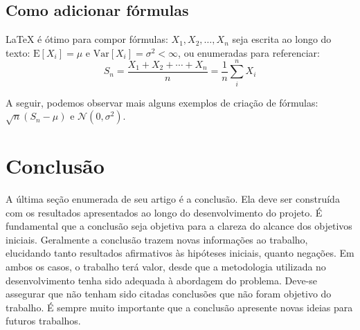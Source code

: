 \documentclass[a4paper,12pt]{article}
\begin{document}
\subsection{Como adicionar fórmulas}

\LaTeX{} é ótimo para compor fórmulas: $X_1, X_2, \ldots, X_n$ seja escrita ao longo do texto: $\text{E}[X_i] = \mu$ e $\text{Var}[X_i] = \sigma^2 < \infty$, ou enumeradas para referenciar:
\begin{equation}
  S_n = \frac{X_1 + X_2 + \cdots + X_n}{n}
      = \frac{1}{n}\sum_{i}^{n} X_i
\end{equation}

A seguir, podemos observar mais alguns exemplos de criação de fórmulas: $\sqrt{n}(S_n - \mu)$ e $\mathcal{N}(0, \sigma^2)$.

\section{Conclusão}
A última seção enumerada de seu artigo é a conclusão. Ela deve ser construída  com os resultados apresentados ao longo do desenvolvimento do projeto. É fundamental que a conclusão seja objetiva para a clareza do alcance dos objetivos iniciais. Geralmente a conclusão trazem novas informações ao trabalho, elucidando tanto resultados afirmativos às hipóteses iniciais, quanto negações. Em ambos os casos, o trabalho terá valor, desde que a metodologia utilizada no desenvolvimento tenha sido adequada à abordagem do problema.
Deve-se assegurar que não tenham sido citadas conclusões que não foram objetivo do trabalho. É sempre muito importante que a conclusão apresente novas ideias para futuros trabalhos.



\end{document}
